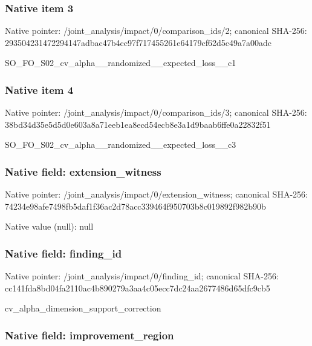 \documentclass[10pt,a4paper]{article}
\begin{document}
\subsubsection{Native item 3}


Native pointer: /joint\_analysis/impact/0\allowbreak{}/comparison\_ids/2; canonical SHA-256: 293504231472294147adbac4\allowbreak{}7b4cc97f717455261e64179c\allowbreak{}f62d5c49a7a00adc


SO\_FO\_S02\_cv\_alpha\_\_rand\allowbreak{}omized\_\_expected\_loss\_\_c\allowbreak{}1


\subsubsection{Native item 4}


Native pointer: /joint\_analysis/impact/0\allowbreak{}/comparison\_ids/3; canonical SHA-256: 38bd34d35e5d5d0e603a8a71\allowbreak{}eeb1ea8ecd54ecb8e3a1d9ba\allowbreak{}ab6ffe0a22832f51


SO\_FO\_S02\_cv\_alpha\_\_rand\allowbreak{}omized\_\_expected\_loss\_\_c\allowbreak{}3


\subsubsection{Native field: extension\_witness}


Native pointer: /joint\_analysis/impact/0\allowbreak{}/extension\_witness; canonical SHA-256: 74234e98afe7498fb5daf1f3\allowbreak{}6ac2d78acc339464f950703b\allowbreak{}8c019892f982b90b



Native value (null): null



\subsubsection{Native field: finding\_id}


Native pointer: /joint\_analysis/impact/0/finding\_id; canonical SHA-256: cc141fda8bd04fa2110ac4b8\allowbreak{}90279a3aa4c05ecc7dc24aa2\allowbreak{}677486d65dfc9cb5


cv\_alpha\_dimension\_support\_correction


\subsubsection{Native field: improvement\_region}
\end{document}
